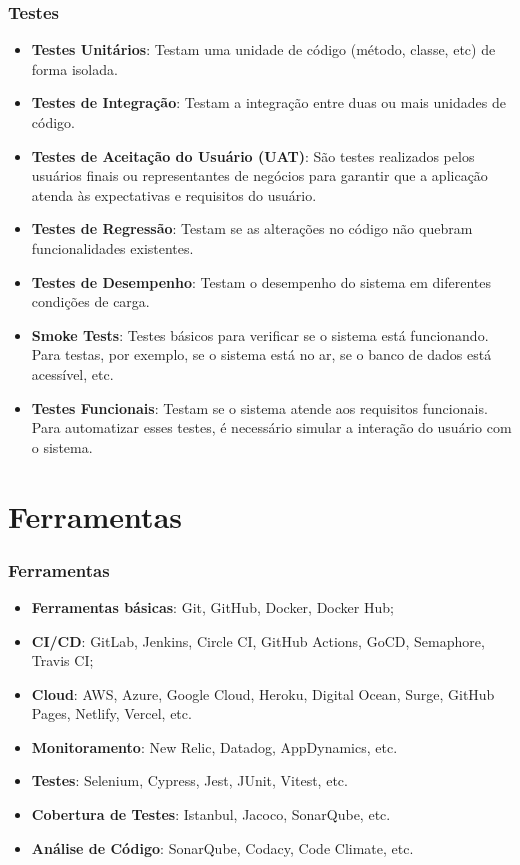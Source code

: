 \documentclass[
	9pt, %
	t, %
]{beamer}
\begin{document}
\begin{frame}
	\frametitle{Testes}
	\begin{itemize}
		\item \textbf{Testes Unitários}: Testam uma unidade de código (método, classe, etc) de forma isolada.
		\item \textbf{Testes de Integração}: Testam a integração entre duas ou mais unidades de código.
		\item \textbf{Testes de Aceitação do Usuário (UAT)}: São testes realizados pelos usuários finais ou representantes de negócios para garantir que a aplicação atenda às expectativas e requisitos do usuário.
		\item \textbf{Testes de Regressão}: Testam se as alterações no código não quebram funcionalidades existentes.
		\item \textbf{Testes de Desempenho}: Testam o desempenho do sistema em diferentes condições de carga. 
		\item \textbf{Smoke Tests}: Testes básicos para verificar se o sistema está funcionando. Para testas, por exemplo, se o sistema está no ar, se o banco de dados está acessível, etc.
		\item \textbf{Testes Funcionais}: Testam se o sistema atende aos requisitos funcionais. Para automatizar esses testes, é necessário simular a interação do usuário com o sistema.
	\end{itemize}

\end{frame}

\section{Ferramentas}

\begin{frame}
	\frametitle{Ferramentas}
	\begin{itemize}
		\item \textbf{Ferramentas básicas}: Git, GitHub, Docker, Docker Hub;
		\item \textbf{CI/CD}: GitLab, Jenkins, Circle CI, GitHub Actions, GoCD, Semaphore, Travis CI;
		\item \textbf{Cloud}: AWS, Azure, Google Cloud, Heroku, Digital Ocean, Surge, GitHub Pages, Netlify, Vercel, etc.
		\item \textbf{Monitoramento}: New Relic, Datadog, AppDynamics, etc.
		\item \textbf{Testes}: Selenium, Cypress, Jest, JUnit, Vitest, etc.
		\item \textbf{Cobertura de Testes}: Istanbul, Jacoco, SonarQube, etc.
		\item \textbf{Análise de Código}: SonarQube, Codacy, Code Climate, etc.
	\end{itemize}

\end{frame}
\end{document}
